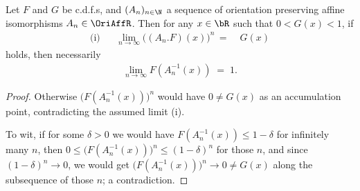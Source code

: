 \begin{lemma}
  \label{lem:ev-limit-cdf-affine-tendsto-one}
  \leanok
  Let $F$ and $G$ be c.d.f.s, and $(A_n)_{n \in \N}$ a sequence of orientation
  preserving affine isomorphisms $A_n \in \OriAffR$. Then for any $x \in \bR$
  such that $0 < G(x) < 1$, if
  \begin{align*}
  \text{(i)} & & \lim_{n \to \infty} \big( (A_n.F)(x) \big)^n \, = \; & G(x)
  \end{align*}
  holds, then necessarily
  \begin{align*}
    \lim_{n \to \infty} F (A_n^{-1}(x)) \; = \; 1 .
  \end{align*}
\end{lemma}
\begin{proof}
  Otherwise $\big( F (A_n^{-1}(x)) \big)^n$ would have $0 \ne G(x)$
  as an accumulation point, contradicting the assumed limit (i).

  To wit, if for some $\delta > 0$ we would have
  $F (A_n^{-1}(x)) \le 1 - \delta$ for infinitely many $n$, then
  $0 \le \big( F (A_n^{-1}(x)) \big)^n \le (1 - \delta)^n $
  for those $n$, and since $(1 - \delta)^n \to 0$, we would
  get $\big( F (A_n^{-1}(x)) \big)^n \to 0 \ne G(x)$ along the
  subsequence of those $n$; a contradiction.
\end{proof}

